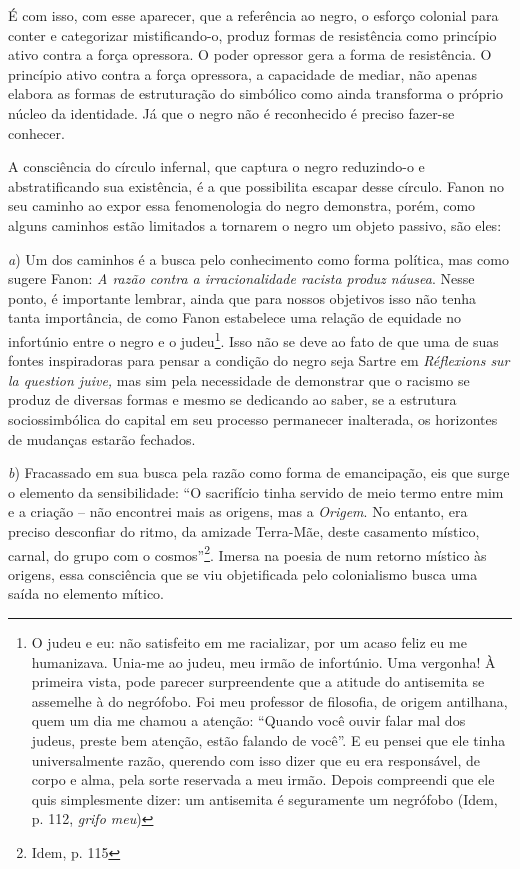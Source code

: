 É com isso, com esse aparecer, que a referência ao negro, o esforço
colonial para conter e categorizar mistificando-o, produz formas de
resistência como princípio ativo contra a força opressora. O poder
opressor gera a forma de resistência. O princípio ativo contra a força
opressora, a capacidade de mediar, não apenas elabora as formas de
estruturação do simbólico como ainda transforma o próprio núcleo da
identidade. Já que o negro não é reconhecido é preciso fazer-se
conhecer.

A consciência do círculo infernal, que captura o negro reduzindo-o e
abstratificando sua existência, é a que possibilita escapar desse
círculo. Fanon no seu caminho ao expor essa fenomenologia do negro
demonstra, porém, como alguns caminhos estão limitados a tornarem o
negro um objeto passivo, são eles:

\emph{a}) Um dos caminhos é a busca pelo conhecimento como forma
política, mas como sugere Fanon: \emph{A razão contra a irracionalidade
racista produz náusea}. Nesse ponto, é importante lembrar, ainda que
para nossos objetivos isso não tenha tanta importância, de como Fanon
estabelece uma relação de equidade no infortúnio entre o negro e o
judeu\footnote{O judeu e eu: não satisfeito em me racializar, por um
  acaso feliz eu me humanizava. Unia-me ao judeu, meu irmão de
  infortúnio. Uma vergonha! À primeira vista, pode parecer surpreendente
  que a atitude do antisemita se assemelhe à do negrófobo. Foi meu
  professor de filosofia, de origem antilhana, quem um dia me chamou a
  atenção: ``Quando você ouvir falar mal dos judeus, preste bem atenção,
  estão falando de você''. E eu pensei que ele tinha universalmente
  razão, querendo com isso dizer que eu era responsável, de corpo e
  alma, pela sorte reservada a meu irmão. Depois compreendi que ele quis
  simplesmente dizer: um antisemita é seguramente um negrófobo (Idem, p.
  112, \emph{grifo meu})}. Isso não se deve ao fato de que uma de suas
fontes inspiradoras para pensar a condição do negro seja Sartre em
\emph{Réflexions sur la question juive,} mas sim pela necessidade de
demonstrar que o racismo se produz de diversas formas e mesmo se
dedicando ao saber, se a estrutura sociossimbólica do capital em seu
processo permanecer inalterada, os horizontes de mudanças estarão
fechados.

\emph{b}) Fracassado em sua busca pela razão como forma de emancipação,
eis que surge o elemento da sensibilidade: ``O sacrifício tinha servido
de meio termo entre mim e a criação -- não encontrei mais as origens,
mas a \emph{Origem}. No entanto, era preciso desconfiar do ritmo, da
amizade Terra-Mãe, deste casamento místico, carnal, do grupo com o
cosmos''\footnote{Idem, p. 115}. Imersa na poesia de num retorno místico
às origens, essa consciência que se viu objetificada pelo colonialismo
busca uma saída no elemento mítico.

